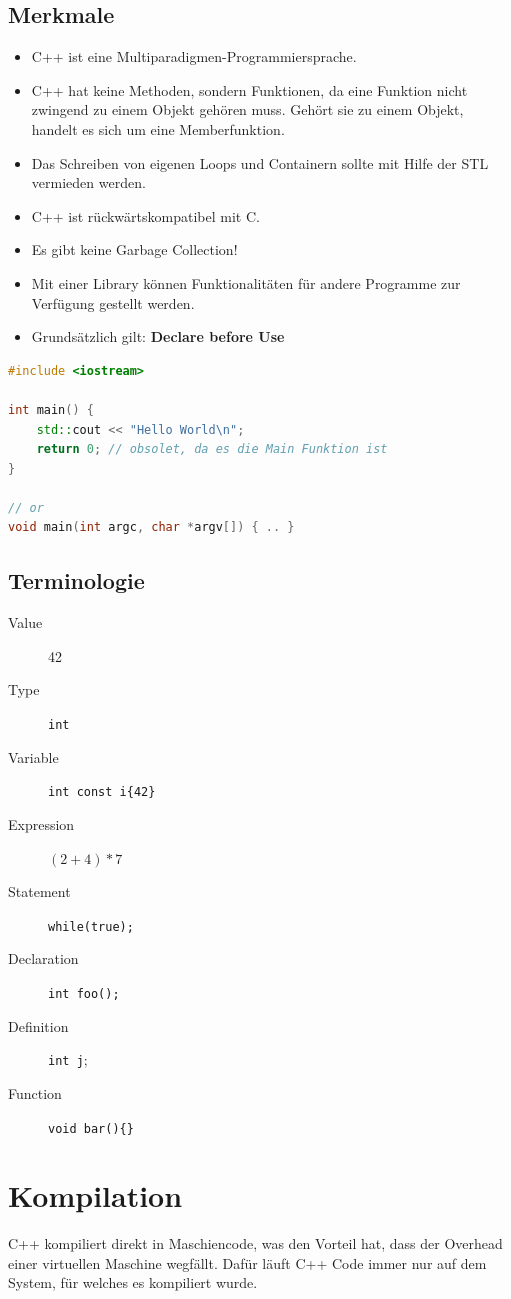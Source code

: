 \subsection{Merkmale}
\begin{itemize}
	\item C++ ist eine Multiparadigmen-Programmiersprache.
	\item C++ hat keine Methoden, sondern Funktionen, da eine Funktion nicht zwingend zu einem Objekt gehören muss. Gehört sie zu einem Objekt, handelt es sich um eine Memberfunktion.
	\item Das Schreiben von eigenen Loops und Containern sollte mit Hilfe der STL vermieden werden.
	\item C++ ist rückwärtskompatibel mit C.
	\item Es gibt keine Garbage Collection!
	\item Mit einer Library können Funktionalitäten für andere Programme zur Verfügung gestellt werden.
	\item Grundsätzlich gilt: \textbf{Declare before Use}
\end{itemize}

\begin{lstlisting}[language=C++, caption=Hello World]
#include <iostream>

int main() {
	std::cout << "Hello World\n";
	return 0; // obsolet, da es die Main Funktion ist
}

// or
void main(int argc, char *argv[]) { .. }
\end{lstlisting}

\subsection{Terminologie}
\begin{description}
	\item[Value] 42
	\item[Type] \lstinline|int|
	\item[Variable] \lstinline|int const i{42}|
	\item[Expression] $(2+4)*7$
	\item[Statement] \lstinline|while(true);|
	\item[Declaration] \lstinline|int foo();|
	\item[Definition] \lstinline|int j|;
	\item[Function] \lstinline|void bar(){}|
\end{description}

\section{Kompilation}
C++ kompiliert direkt in Maschiencode, was den Vorteil hat, dass der Overhead einer virtuellen Maschine wegfällt. Dafür läuft C++ Code immer nur auf dem System, für welches es kompiliert wurde.
